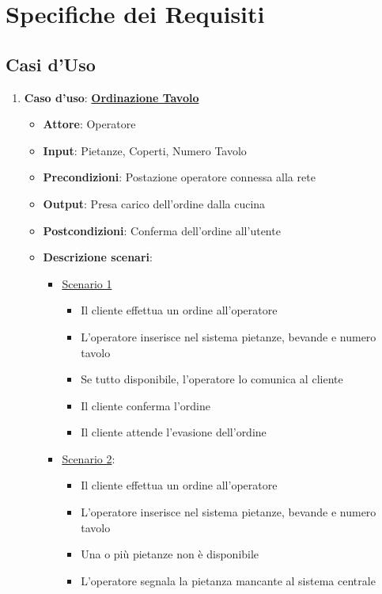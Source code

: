 \chapter{Specifiche dei Requisiti}
\section{Casi d'Uso}
\begin{enumerate}
    
    \item {\bf Caso d'uso}: \uline{{\bf Ordinazione Tavolo}}
    \begin{itemize}
        \item {\bf Attore}: Operatore
        \item {\bf Input}: Pietanze, Coperti, Numero Tavolo
        \item {\bf Precondizioni}: Postazione operatore connessa alla rete
        \item {\bf Output}: Presa carico dell'ordine dalla cucina
        \item {\bf Postcondizioni}: Conferma dell'ordine all'utente
        \item {\bf Descrizione scenari}:
        \begin{itemize}
            \item \uline {Scenario 1}
            \begin{itemize}
                \item Il cliente effettua un ordine all'operatore
                \item L'operatore inserisce nel sistema pietanze, bevande e 
                    numero tavolo
                \item Se tutto disponibile, l'operatore lo comunica al cliente
                \item Il cliente conferma l'ordine
                \item Il cliente attende l'evasione dell'ordine
            \end{itemize}
            \item \uline {Scenario 2}:
            \begin{itemize}
                \item Il cliente effettua un ordine all'operatore
                \item L'operatore inserisce nel sistema pietanze, bevande e numero tavolo
                \item Una o pi\`u pietanze non \`e disponibile
                \item L'operatore segnala la pietanza mancante al sistema centrale

\end{itemize}
\end{itemize}
\end{itemize}
\end{enumerate}
